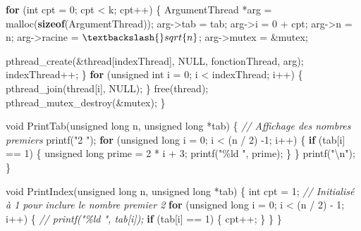 \documentclass[
    ]{article}
\newenvironment{Shaded}{}{}
\newcommand{\CommentTok}[1]{\textcolor[rgb]{0.38,0.63,0.69}{\textit{#1}}}
\newcommand{\ControlFlowTok}[1]{\textcolor[rgb]{0.00,0.44,0.13}{\textbf{#1}}}
\newcommand{\DataTypeTok}[1]{\textcolor[rgb]{0.56,0.13,0.00}{#1}}
\newcommand{\DecValTok}[1]{\textcolor[rgb]{0.25,0.63,0.44}{#1}}
\newcommand{\KeywordTok}[1]{\textcolor[rgb]{0.00,0.44,0.13}{\textbf{#1}}}
\newcommand{\NormalTok}[1]{#1}
\newcommand{\SpecialCharTok}[1]{\textcolor[rgb]{0.25,0.44,0.63}{#1}}
\newcommand{\StringTok}[1]{\textcolor[rgb]{0.25,0.44,0.63}{#1}}
\begin{document}
\begin{Shaded}
\begin{Highlighting}[]
    \ControlFlowTok{for}\NormalTok{ (}\DataTypeTok{int}\NormalTok{ cpt = }\DecValTok{0}\NormalTok{; cpt \textless{} k; cpt++)}
\NormalTok{    \{}
\NormalTok{        ArgumentThread *arg = malloc(}\KeywordTok{sizeof}\NormalTok{(ArgumentThread));}
\NormalTok{        arg{-}\textgreater{}tab = tab;}
\NormalTok{        arg{-}\textgreater{}i = }\DecValTok{0}\NormalTok{ + cpt;}
\NormalTok{        arg{-}\textgreater{}n = n;}
\NormalTok{        arg{-}\textgreater{}racine = $\textbackslash{}sqrt\{n\}$;}
\NormalTok{        arg{-}\textgreater{}mutex = \&mutex;}

\NormalTok{        pthread\_create(\&thread[indexThread], NULL, fonctionThread, arg);}
\NormalTok{        indexThread++;}
\NormalTok{    \}}
    \ControlFlowTok{for}\NormalTok{ (}\DataTypeTok{unsigned} \DataTypeTok{int}\NormalTok{ i = }\DecValTok{0}\NormalTok{; i \textless{} indexThread; i++)}
\NormalTok{    \{}
\NormalTok{        pthread\_join(thread[i], NULL);}
\NormalTok{    \}}
\NormalTok{    free(thread);}
\NormalTok{    pthread\_mutex\_destroy(\&mutex);}
\NormalTok{\}}

\DataTypeTok{void}\NormalTok{ PrintTab(}\DataTypeTok{unsigned} \DataTypeTok{long}\NormalTok{ n, }\DataTypeTok{unsigned} \DataTypeTok{long}\NormalTok{ *tab)}
\NormalTok{\{}
    \CommentTok{// Affichage des nombres premiers}
\NormalTok{    printf(}\StringTok{"2 "}\NormalTok{);}
    \ControlFlowTok{for}\NormalTok{ (}\DataTypeTok{unsigned} \DataTypeTok{long}\NormalTok{ i = }\DecValTok{0}\NormalTok{; i \textless{} (n / }\DecValTok{2}\NormalTok{) {-}}\DecValTok{1}\NormalTok{; i++)}
\NormalTok{    \{}
        \ControlFlowTok{if}\NormalTok{ (tab[i] == }\DecValTok{1}\NormalTok{)}
\NormalTok{        \{}
            \DataTypeTok{unsigned} \DataTypeTok{long}\NormalTok{ prime = }\DecValTok{2}\NormalTok{ * i + }\DecValTok{3}\NormalTok{;}
\NormalTok{            printf(}\StringTok{"\%ld "}\NormalTok{, prime);}
\NormalTok{        \}}
\NormalTok{    \}}
\NormalTok{    printf(}\StringTok{"}\SpecialCharTok{\textbackslash{}n}\StringTok{"}\NormalTok{);}
\NormalTok{\}}

\DataTypeTok{void}\NormalTok{ PrintIndex(}\DataTypeTok{unsigned} \DataTypeTok{long}\NormalTok{ n, }\DataTypeTok{unsigned} \DataTypeTok{long}\NormalTok{ *tab)}
\NormalTok{\{}
    \DataTypeTok{int}\NormalTok{ cpt = }\DecValTok{1}\NormalTok{; }\CommentTok{// Initialisé à 1 pour inclure le nombre premier 2}
    \ControlFlowTok{for}\NormalTok{ (}\DataTypeTok{unsigned} \DataTypeTok{long}\NormalTok{ i = }\DecValTok{0}\NormalTok{; i \textless{} (n / }\DecValTok{2}\NormalTok{) {-} }\DecValTok{1}\NormalTok{; i++)}
\NormalTok{    \{}
        \CommentTok{// printf("\%ld ", tab[i]);}
        \ControlFlowTok{if}\NormalTok{ (tab[i] == }\DecValTok{1}\NormalTok{)}
\NormalTok{        \{}
\NormalTok{            cpt++;}
\NormalTok{        \}}
\NormalTok{    \}}
\NormalTok{\}}


\end{Highlighting}
\end{Shaded}
\end{document}
